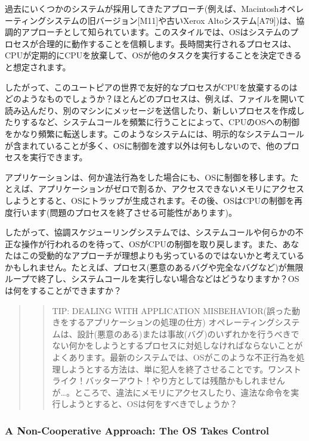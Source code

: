 過去にいくつかのシステムが採用してきたアプローチ(例えば、Macintoshオペレーティングシステムの旧バージョン{[}M11{]}や古いXerox
Altoシステム{[}A79{]})は、協調的アプローチとして知られています。このスタイルでは、OSはシステムのプロセスが合理的に動作することを信頼します。長時間実行されるプロセスは、CPUが定期的にCPUを放棄して、OSが他のタスクを実行することを決定できると想定されます。

したがって、このユートピアの世界で友好的なプロセスがCPUを放棄するのはどのようなものでしょうか？ほとんどのプロセスは、例えば、ファイルを開いて読み込んだり、別のマシンにメッセージを送信したり、新しいプロセスを作成したりするなど、システムコールを頻繁に行うことによって、CPUのOSへの制御をかなり頻繁に転送します。このようなシステムには、明示的なシステムコールが含まれていることが多く、OSに制御を渡す以外は何もしないので、他のプロセスを実行できます。

アプリケーションは、何か違法行為をした場合にも、OSに制御を移します。たとえば、アプリケーションがゼロで割るか、アクセスできないメモリにアクセスしようとすると、OSにトラップが生成されます。その後、OSはCPUの制御を再度行います(問題のプロセスを終了させる可能性があります)。

したがって、協調スケジューリングシステムでは、システムコールや何らかの不正な操作が行われるのを待って、OSがCPUの制御を取り戻します。また、あなたはこの受動的なアプローチが理想よりも劣っているのではないかと考えているかもしれません。たとえば、プロセス(悪意のあるバグや完全なバグなど)が無限ループで終了し、システムコールを実行しない場合などはどうなりますか？OSは何をすることができますか？

\begin{quote}
\begin{quote}
TIP: DEALING WITH APPLICATION
MISBEHAVIOR(誤った動きをするアプリケーションの処理の仕方)
オペレーティングシステムは、設計(悪意のある)または事故(バグ)のいずれかを行うべきでない何かをしようとするプロセスに対処しなければならないことがよくあります。最新のシステムでは、OSがこのような不正行為を処理しようとする方法は、単に犯人を終了させることです。ワンストライク！バッターアウト！やり方としては残酷かもしれませんが\ldots。ところで、違法にメモリにアクセスしたり、違法な命令を実行しようとすると、OSは何をすべきでしょうか？
\end{quote}
\end{quote}

\hypertarget{a-non-cooperative-approach-the-os-takes-control}{%
\subsubsection*{A Non-Cooperative Approach: The OS Takes
Control}\label{a-non-cooperative-approach-the-os-takes-control}}


